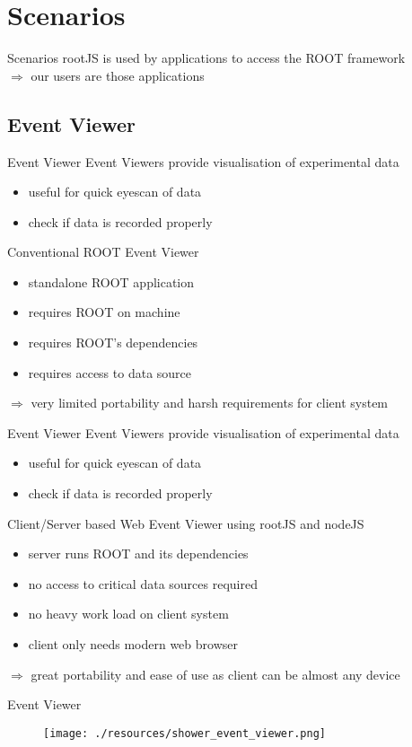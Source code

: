 \section{Scenarios}
\begin{frame}{Scenarios}
rootJS is used by applications to access the ROOT framework\\
\pause $\Rightarrow $ our users are those applications
\end{frame}

\subsection{Event Viewer}
\begin{frame}{Event Viewer}
 \pause   Event Viewers provide visualisation of experimental data
  \begin{itemize}
    \pause \item useful for quick eyescan of data
    \pause \item check if data is recorded properly
  \end{itemize}
  \pause
  \medskip
   Conventional ROOT Event Viewer
  \begin{itemize}
  \pause \item standalone ROOT application
   \pause \item requires ROOT on machine
   \pause \item requires ROOT's dependencies
   \pause \item requires access to data source
   \end{itemize}
   \pause $\Rightarrow $ very limited portability and harsh requirements for client system
\end{frame}

\begin{frame}{Event Viewer}
 Event Viewers provide visualisation of experimental data
  \begin{itemize}
   \item useful for quick eyescan of data
   \item check if data is recorded properly
  \end{itemize}
   \medskip
   Client/Server based Web Event Viewer using rootJS and nodeJS
  \begin{itemize}
  \pause \item server runs ROOT and its dependencies
   \pause \item no access to critical data sources required
   \pause \item no heavy work load on client system
   \pause \item client only needs modern web browser
   \end{itemize}

   \pause $\Rightarrow $ great portability and ease of use as client can be almost any device
\end{frame}


\begin{frame}{Event Viewer}
  \begin{figure}[htb]
      \texttt{[image: ./resources/shower\_event\_viewer.png]}
      \nocite{cern:root:eventviewer}
   \end{figure}
\end{frame}
